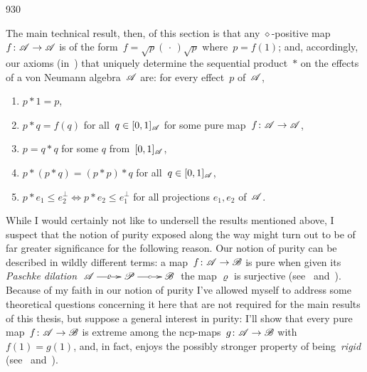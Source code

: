 \begin{parsec}{930}
\begin{point}{10}
The main technical result, then, of this section
is that any $\diamond$-positive map $f\colon\mathscr{A}\to\mathscr{A}$
is of the form~$f=\sqrt{p}(\,\cdot\,)\sqrt{p}$
where~$p=f(1)$;
and, accordingly, our axioms 
(in~)
that uniquely
determine the sequential product~$\ast$
on the effects of a von Neumann algebra~$\mathscr{A}$ are:
for every effect~$p$ of~$\mathscr{A}$,
\begin{enumerate}
\item
$p\ast 1=p$,
\item
$p\ast q = f(q)$
for all~$q\in [0,1]_{\mathscr{A}}$
for some pure map~$f\colon \mathscr{A}\to\mathscr{A}$,
\item
$p=q\ast q$ for some $q$ from~$[0,1]_{\mathscr{A}}$,
\item
$p \ast (p \ast q) = (p\ast p)\ast q$
for all~$q\in[0,1]_{\mathscr{A}}$,
\item
$p \ast e_1 \leq e_2^\perp\iff
p \ast e_2 \leq e_1^\perp$
for all projections $e_1,e_2$ of~$\mathscr{A}$.
\end{enumerate}%
While I would certainly not like
to undersell the results mentioned above,
I suspect that the notion of purity exposed along the way
might turn out to be of far greater significance
for the following reason.
Our notion of purity can be described in
wildly different terms:
a map~$f\colon \mathscr{A}\to\mathscr{B}$ is pure when given its
\emph{Paschke dilation}
$\xymatrix{\scrA
	\ar[r]|-\varrho
&
	\scrP\ar[r]|-c
&
\scrB}$
the map $\varrho$ is surjective
(see~ and~\cite{wwpaschke}).
Because of my faith in our notion of purity I've allowed myself
to address some theoretical questions concerning it
here that are not required for the main results of this thesis,
but suppose a general interest in purity:
I'll show that every pure map~$f\colon\mathscr{A}\to\mathscr{B}$
is extreme among the ncp-maps~$g\colon \mathscr{A}\to\mathscr{B}$ with~$f(1)=g(1)$,
and, in fact, enjoys the possibly stronger property 
of being~\emph{rigid} (see~ and~).
\end{point}
\end{parsec}
